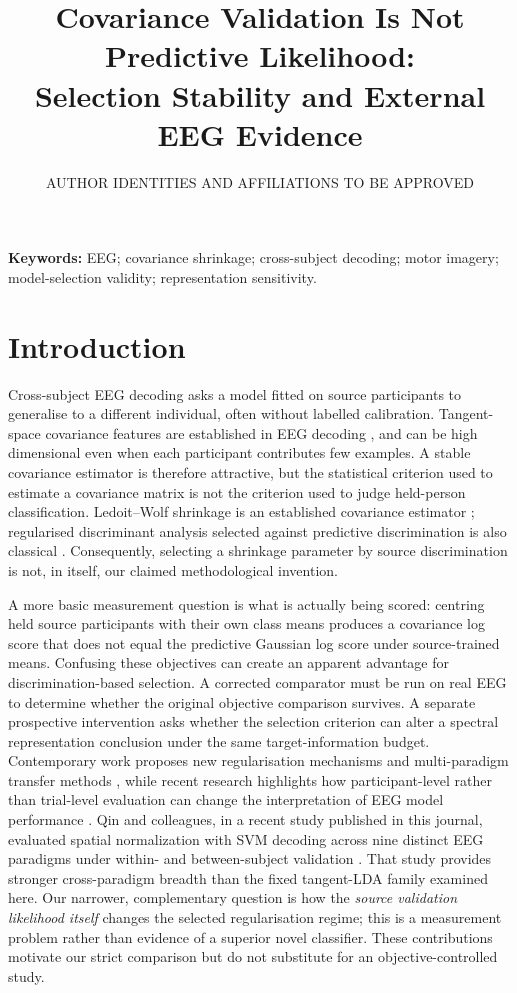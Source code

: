 \documentclass[11pt,a4paper]{article}
\title{Covariance Validation Is Not Predictive Likelihood:\\
Selection Stability and External EEG Evidence}
\author{AUTHOR IDENTITIES AND AFFILIATIONS TO BE APPROVED}
\date{}
\begin{document}
\maketitle

\noindent\textbf{Keywords:} EEG; covariance shrinkage; cross-subject decoding;
motor imagery; model-selection validity; representation sensitivity.

\section{Introduction}
Cross-subject EEG decoding asks a model fitted on source participants to
generalise to a different individual, often without labelled calibration.
Tangent-space covariance features are established in EEG decoding
\cite{barachant2012riemannian}, and can be high dimensional even
when each participant contributes few examples. A stable covariance estimator is therefore
attractive, but the statistical criterion used to estimate a covariance
matrix is not the criterion used to judge held-person classification.
Ledoit--Wolf shrinkage is an established covariance estimator
\cite{ledoit2004}; regularised discriminant analysis selected against
predictive discrimination is also classical \cite{friedman1989}.
Consequently, selecting a shrinkage parameter by source discrimination
is not, in itself, our claimed methodological invention.

A more basic measurement question is what is actually being scored:
centring held source participants with their own class means produces a
covariance log score that does not equal the predictive Gaussian log score
under source-trained means. Confusing these objectives can create an
apparent advantage for discrimination-based selection. A corrected
comparator must be run on real EEG to determine whether the original
objective comparison survives. A separate prospective intervention asks
whether the selection criterion can alter a spectral representation
conclusion under the same target-information budget. Contemporary work proposes
new regularisation mechanisms and multi-paradigm transfer methods
\cite{miao2025freezing,morvay2026wbt,he2026cyclic}, while recent research highlights
how participant-level rather than trial-level evaluation can change the
interpretation of EEG model performance \cite{gil2026subjectvalidation}.
Qin and colleagues, in a recent study published in this journal,
evaluated spatial normalization with SVM decoding across nine
distinct EEG paradigms under within- and between-subject validation
\cite{qin2026spatialnorm}. That study provides stronger
cross-paradigm breadth than the fixed tangent-LDA family examined here.
Our narrower, complementary question is how the \emph{source
validation likelihood itself} changes the selected
regularisation regime; this is a measurement problem rather
than evidence of a superior novel classifier.
These contributions motivate our strict comparison but do not substitute
for an objective-controlled study.
\end{document}
